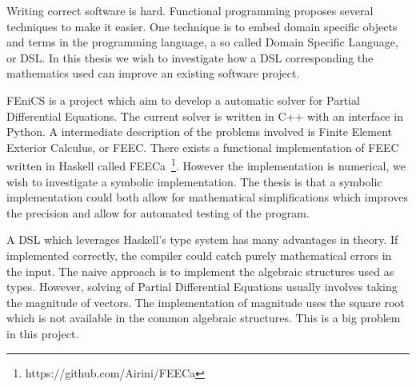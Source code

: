 \documentclass{scrartcl}
\begin{document}
Writing correct software is hard.
Functional programming proposes several techniques to make it easier.
One technique is to embed domain specific objects and terms in the programming
language, a so called Domain Specific Language, or DSL.
In this thesis we wish to investigate how a DSL
corresponding the mathematics used can improve an existing software project.

FEniCS is a project which aim to develop a automatic solver for Partial
Differential Equations. The current solver is written in C++ with an interface
in Python. A intermediate description of the problems involved is Finite Element
Exterior Calculus, or FEEC. There exists a functional implementation of FEEC
written in Haskell called FEECa~\footnote{https://github.com/Airini/FEECa}.
However the implementation is numerical, we wish to investigate a symbolic
implementation.  The thesis is that a symbolic implementation could both allow
for mathematical simplifications which improves the precision and allow for
automated testing of the program.






A DSL which leverages Haskell's type system has many advantages in theory. If
implemented correctly, the compiler could catch purely mathematical errors in
the input. The naive approach is to implement the algebraic structures used
as types. However, solving of Partial Differential Equations usually involves
taking the magnitude of vectors. The implementation of magnitude uses the
square root which is not available in the common algebraic structures. This is
a big problem in this project.
\end{document}
